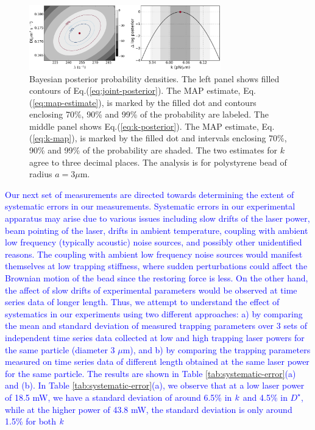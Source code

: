\documentclass[fleqn,10pt]{wlscirep}
\begin{document}
\begin{figure}[t]
\includegraphics[width=0.74\textwidth]{figure3}

\caption{Bayesian posterior probability densities. The left panel shows filled
contours of Eq.(\ref{eq:joint-posterior}). The MAP estimate, Eq.(\ref{eq:map-estimate}),
is marked by the filled dot and contours enclosing 70\%, 90\% and
99\% of the probability are labeled. The middle panel shows Eq.(\ref{eq:k-posterior}).
The MAP estimate, Eq.(\ref{eq:k-map}), is marked by the filled dot
and intervals enclosing 70\%, 90\% and 99\% of the probability are
shaded. The two estimates for $k$ agree to three decimal places. The analysis is for polystyrene bead of radius $a=3\mu$m.\label{fig:bayes-I-and-II} }
\end{figure}
\textcolor{blue}{Our next set of measurements are directed towards
determining the extent of systematic errors in our measurements. Systematic
errors in our experimental apparatus may arise due to various issues
including slow drifts of the laser power, beam pointing of the laser,
drifts in ambient temperature, coupling with ambient low frequency
(typically acoustic) noise sources, and possibly other unidentified
reasons. The coupling with ambient low frequency noise sources would
manifest themselves at low trapping stiffness, where sudden perturbations
could affect the Brownian motion of the bead since the restoring force
is less. On the other hand, the affect of slow drifts of experimental
parameters would be observed at time series data of longer length.
Thus, we attempt to understand the effect of systematics in our experiments
using two different approaches: a) by comparing the mean and standard
deviation of measured trapping parameters over 3 sets of independent
time series data collected at low and high trapping laser powers for
the same particle (diameter 3 $\mu$m), and b) by comparing the trapping
parameters measured on time series data of different length obtained
at the same laser power for the same particle. The results are shown
in Table \ref{tab:systematic-error}(a) and (b). In Table \ref{tab:systematic-error}(a),
we observe that at a low laser power of 18.5 mW, we have a standard
deviation of around 6.5\% in }${\color{blue}k}$\textcolor{blue}{{}
and 4.5\% in $D^{\star}$, while at the higher power of 43.8 mW, the
standard deviation is only around 1.5\% for both }${\color{blue}k}$
\end{document}
